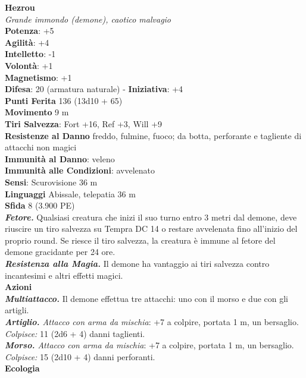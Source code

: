 \begin{multicols}{2}
\medskip\textbf{Hezrou}\\
\emph{Grande immondo (demone), caotico malvagio}\\
\textbf{Potenza}: +5\\
\textbf{Agilità}: +4\\
\textbf{Intelletto}: -1\\
\textbf{Volontà}: +1\\
\textbf{Magnetismo}: +1\\
\textbf{Difesa}: 20 (armatura naturale) - \textbf{Iniziativa}: +4\\
\textbf{Punti Ferita} 136 (13d10 + 65)\\
\textbf{Movimento} 9 m\\
\textbf{Tiri Salvezza}: Fort +16, Ref +3, Will +9\\
\textbf{Resistenze al Danno} freddo, fulmine, fuoco; da botta, perforante e tagliente di attacchi non magici\\
\textbf{Immunità al Danno}: veleno\\
\textbf{Immunità alle Condizioni}: avvelenato\\
\textbf{Sensi}: Scurovisione 36 m\\
\textbf{Linguaggi} Abissale, telepatia 36 m \\
\textbf{Sfida} 8 (3.900 PE)\smallskip\\
\emph{\textbf{Fetore.}} Qualsiasi creatura che inizi il suo turno entro 3 metri dal demone, deve riuscire un tiro salvezza su Tempra DC 14 o restare avvelenata fino all'inizio del proprio round. Se riesce il tiro salvezza, la creatura è immune al fetore del demone gracidante per 24 ore.\\
\emph{\textbf{Resistenza alla Magia.}} Il demone ha vantaggio ai tiri salvezza contro incantesimi e altri effetti magici.\\
\smallskip\textbf{Azioni}\\
\emph{\textbf{Multiattacco.}} Il demone effettua tre attacchi: uno con il morso e due con gli artigli.\\
\emph{\textbf{Artiglio.} Attacco con arma da mischia}: +7 a colpire, portata 1 m, un bersaglio.\\
\emph{Colpisce:} 11 (2d6 + 4) danni taglienti. \\
\emph{\textbf{Morso.} Attacco con arma da mischia}: +7 a colpire, portata 1 m, un bersaglio.\\
\emph{Colpisce:} 15 (2d10 + 4) danni perforanti.\\
\textbf{Ecologia}\\

\end{multicols}
